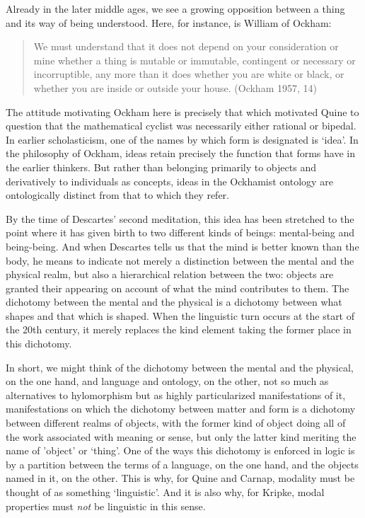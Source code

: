 \documentclass[]{article}
\begin{document}
Already in the later middle ages, we see a growing opposition between a thing and its way of being understood. Here, for instance, is William of Ockham:

\begin{quote}
We must understand that it does not depend on your consideration or mine whether a thing is mutable or immutable, contingent or necessary or incorruptible, any more than it does whether you are white or black, or whether you are inside or outside your house. (Ockham 1957, 14)
\end{quote}

The attitude motivating Ockham here is precisely that which motivated Quine to question that the mathematical cyclist was necessarily either rational or bipedal. In earlier scholasticism, one of the names by which form is designated is `idea'. In the philosophy of Ockham, ideas retain precisely the function that forms have in the earlier thinkers. But rather than belonging primarily to objects and derivatively to individuals as concepts, ideas in the Ockhamist ontology are ontologically distinct from that to which they refer.

By the time of Descartes' second meditation, this idea has been stretched to the point where it has given birth to two different kinds of beings: mental-being and being-being. And when Descartes tells us that the mind is better known than the body, he means to indicate not merely a distinction between the mental and the physical realm, but also a hierarchical relation between the two: objects are granted their appearing on account of what the mind contributes to them.  The dichotomy between the mental and the physical is a dichotomy between what shapes and that which is shaped. When the linguistic turn occurs at the start of the 20th century, it merely replaces the kind element taking the former place in this dichotomy. 

In short, we might think of the dichotomy between the mental and the physical, on the one hand, and language and ontology, on the other, not so much as alternatives to hylomorphism but as highly particularized manifestations of it, manifestations on which the dichotomy between matter and form is a dichotomy between different realms of objects, with the former kind of object doing all of the work associated with meaning or sense, but only the latter kind meriting the name of 'object' or `thing'. One of the ways this dichotomy is enforced in logic is by a partition between the terms of a language, on the one hand, and the objects named in it, on the other. This is why, for Quine and Carnap, modality must be thought of as something `linguistic'. And it is also why, for Kripke, modal properties must \textit{not} be linguistic in this sense.
\end{document}
